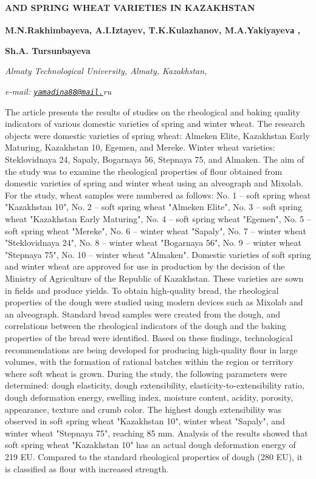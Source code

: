 {{{\bfseries AND SPRING WHEAT VARIETIES IN KAZAKHSTAN}

{\bfseries M.N.Rakhimbayeva, A.I.Iztayev, T.K.Kulazhanov, M.A.Yakiyayevа
\textsuperscript{\envelope },}

{\bfseries Sh.A. Tursunbayeva}

\emph{Almaty Technological University, Almaty, Kazakhstan,}

\emph{e-mail:
\href{mailto:yamadina88@mail.}{\nolinkurl{yamadina88@mail.}}ru}

The article presents the results of studies on the rheological and
baking quality indicators of various domestic varieties of spring and
winter wheat. The research objects were domestic varieties of spring
wheat: Almeken Elite, Kazakhstan Early Maturing, Kazakhstan 10, Egemen,
and Mereke. Winter wheat varieties: Steklovidnaya 24, Sapaly, Bogarnaya
56, Stepnaya 75, and Almaken. The aim of the study was to examine the
rheological properties of flour obtained from domestic varieties of
spring and winter wheat using an alveograph and Mixolab. For the study,
wheat samples were numbered as follows: No. 1 -- soft spring wheat
"Kazakhstan 10", No. 2 -- soft spring wheat "Almeken Elite", No. 3 --
soft spring wheat "Kazakhstan Early Maturing", No. 4 -- soft spring
wheat "Egemen", No. 5 -- soft spring wheat "Mereke", No. 6 -- winter
wheat "Sapaly", No. 7 -- winter wheat "Steklovidnaya 24", No. 8 --
winter wheat "Bogarnaya 56", No. 9 -- winter wheat "Stepnaya 75", No. 10
-- winter wheat "Almaken". Domestic varieties of soft spring and winter
wheat are approved for use in production by the decision of the Ministry
of Agriculture of the Republic of Kazakhstan. These varieties are sown
in fields and produce yields. To obtain high-quality bread, the
rheological properties of the dough were studied using modern devices
such as Mixolab and an alveograph. Standard bread samples were created
from the dough, and correlations between the rheological indicators of
the dough and the baking properties of the bread were identified. Based
on these findings, technological recommendations are being developed for
producing high-quality flour in large volumes, with the formation of
rational batches within the region or territory where soft wheat is
grown. During the study, the following parameters were determined: dough
elasticity, dough extensibility, elasticity-to-extensibility ratio,
dough deformation energy, swelling index, moisture content, acidity,
porosity, appearance, texture and crumb color. The highest dough
extensibility was observed in soft spring wheat "Kazakhstan 10", winter
wheat "Sapaly", and winter wheat "Stepnaya 75", reaching 85 mm. Analysis
of the results showed that soft spring wheat "Kazakhstan 10" has an
actual dough deformation energy of 219 EU. Compared to the standard
rheological properties of dough (280 EU), it is classified as flour with
increased strength.

}}
